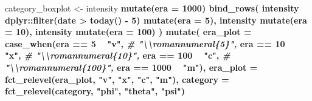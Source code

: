 \documentclass[]{book}
\newenvironment{Shaded}{\begin{snugshade}}{\end{snugshade}}
\newcommand{\CommentTok}[1]{\textcolor[rgb]{0.56,0.35,0.01}{\textit{#1}}}
\newcommand{\DataTypeTok}[1]{\textcolor[rgb]{0.13,0.29,0.53}{#1}}
\newcommand{\DecValTok}[1]{\textcolor[rgb]{0.00,0.00,0.81}{#1}}
\newcommand{\KeywordTok}[1]{\textcolor[rgb]{0.13,0.29,0.53}{\textbf{#1}}}
\newcommand{\NormalTok}[1]{#1}
\newcommand{\OperatorTok}[1]{\textcolor[rgb]{0.81,0.36,0.00}{\textbf{#1}}}
\newcommand{\StringTok}[1]{\textcolor[rgb]{0.31,0.60,0.02}{#1}}
\begin{document}
\begin{Shaded}
\begin{Highlighting}[]
\NormalTok{category_boxplot <-}\StringTok{ }\NormalTok{intensity }\OperatorTok{%>%}
\StringTok{  }\KeywordTok{mutate}\NormalTok{(}\DataTypeTok{era =} \DecValTok{1000}\NormalTok{) }\OperatorTok{%>%}
\StringTok{  }\KeywordTok{bind_rows}\NormalTok{(}
\NormalTok{    intensity }\OperatorTok{%>%}
\StringTok{      }\NormalTok{dplyr}\OperatorTok{::}\KeywordTok{filter}\NormalTok{(date }\OperatorTok{>}\StringTok{ }\KeywordTok{today}\NormalTok{() }\OperatorTok{-}\StringTok{ }\DecValTok{5}\NormalTok{) }\OperatorTok{%>%}
\StringTok{      }\KeywordTok{mutate}\NormalTok{(}\DataTypeTok{era =} \DecValTok{5}\NormalTok{),}
\NormalTok{    intensity }\OperatorTok{%>%}\StringTok{ }\NormalTok{dplyr}\OperatorTok{::}\KeywordTok{filter}\NormalTok{(date }\OperatorTok{>}\StringTok{ }\KeywordTok{today}\NormalTok{() }\OperatorTok{-}\StringTok{ }\DecValTok{10}\NormalTok{) }\OperatorTok{%>%}
\StringTok{      }\KeywordTok{mutate}\NormalTok{(}\DataTypeTok{era =} \DecValTok{10}\NormalTok{),}
\NormalTok{    intensity }\OperatorTok{%>%}\StringTok{ }\NormalTok{dplyr}\OperatorTok{::}\KeywordTok{filter}\NormalTok{(date }\OperatorTok{>}\StringTok{ }\KeywordTok{today}\NormalTok{() }\OperatorTok{-}\StringTok{ }\DecValTok{100}\NormalTok{) }\OperatorTok{%>%}
\StringTok{      }\KeywordTok{mutate}\NormalTok{(}\DataTypeTok{era =} \DecValTok{100}\NormalTok{)}
\NormalTok{  ) }\OperatorTok{%>%}
\StringTok{  }\KeywordTok{mutate}\NormalTok{(}
    \DataTypeTok{era_plot =} \KeywordTok{case_when}\NormalTok{(era }\OperatorTok{==}\StringTok{ }\DecValTok{5} \OperatorTok{~}\StringTok{ "v"}\NormalTok{, }\CommentTok{# "\textbackslash{}\textbackslash{}romannumeral\{5\}",}
\NormalTok{                         era }\OperatorTok{==}\StringTok{ }\DecValTok{10} \OperatorTok{~}\StringTok{ "x"}\NormalTok{,  }\CommentTok{# "\textbackslash{}\textbackslash{}romannumeral\{10\}",}
\NormalTok{                         era }\OperatorTok{==}\StringTok{ }\DecValTok{100} \OperatorTok{~}\StringTok{ "c"}\NormalTok{, }\CommentTok{# "\textbackslash{}\textbackslash{}romannumeral\{100\}",}
\NormalTok{                         era }\OperatorTok{==}\StringTok{ }\DecValTok{1000} \OperatorTok{~}\StringTok{ "m"}\NormalTok{),}
                         \DataTypeTok{era_plot =} \KeywordTok{fct_relevel}\NormalTok{(era_plot, }\StringTok{"v"}\NormalTok{, }\StringTok{"x"}\NormalTok{, }\StringTok{"c"}\NormalTok{, }\StringTok{"m"}\NormalTok{),}
                         \DataTypeTok{category =} \KeywordTok{fct_relevel}\NormalTok{(category, }\StringTok{"phi"}\NormalTok{, }\StringTok{"theta"}\NormalTok{, }\StringTok{"psi"}\NormalTok{)}
}}}}}}}
\end{Highlighting}
\end{Shaded}
\end{document}
